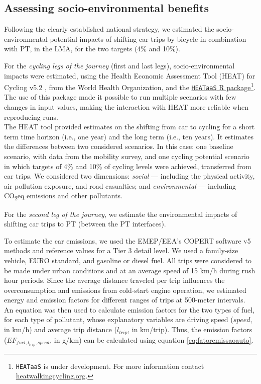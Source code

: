 \documentclass[review, doubleblind, 3p,
authoryear]{elsarticle} %
\begin{document}
\subsection{Assessing socio-environmental
benefits}\label{assessing-socio-environmental-benefits}

Following the clearly established national strategy, we estimated the
socio-environmental potential impacts of shifting car trips by bicycle
in combination with PT, in the LMA, for the two targets (4\% and 10\%).

For the \emph{cycling legs of the journey} (first and last legs),
socio-environmental impacts were estimated, using the Health Economic
Assessment Tool (HEAT) for Cycling v5.2 \citep{HEAT}, from the World
Health Organization, and the
\href{https://github.com/HEAT-WHO/HEAT_heatr_api}{\texttt{HEATaaS} R
package}\footnote{\texttt{HEATaaS} is under development. For more
  information contact
  \href{https://heatwalkingcycling.org}{heatwalkingcycling.org}.}. The
use of this package made it possible to run multiple scenarios with few
changes in input values, making the interaction with HEAT more reliable
when reproducing runs.\\
The HEAT tool provided estimates on the shifting from car to cycling for
a short term time horizon (i.e., one year) and the long term (i.e., ten
years). It estimates the differences between two considered scenarios.
In this case: one baseline scenario, with data from the mobility survey,
and one cycling potential scenario in which targets of 4\% and 10\% of
cycling levels were achieved, transferred from car trips. We considered
two dimensions: \emph{social} --- including the physical activity, air
pollution exposure, and road casualties; and \emph{environmental} ---
including CO\textsubscript{2}eq emissions and other pollutants.

For the \emph{second leg of the journey}, we estimate the environmental
impacts of shifting car trips to PT (between the PT interfaces).

To estimate the car emissions, we used the EMEP/EEA's COPERT software v5
methods and reference values \citep{COPERT} for a Tier 3 detail level.
We used a family-size vehicle, EURO standard, and gasoline or diesel
fuel. All trips were considered to be made under urban conditions and at
an average speed of 15 km/h during rush hour periods. Since the average
distance traveled per trip influences the overconsumption and emissions
from cold-start engine operation, we estimated energy and emission
factors for different ranges of trips at 500-meter intervals.\\
An equation was then used to calculate emission factors for the two
types of fuel, for each type of pollutant, whose explanatory variables
are driving speed (\(speed\), in km/h) and average trip distance
(\(l_{trip}\), in km/trip). Thus, the emission factors
(\(EF_{fuel,l_{trip},speed}\), in g/km) can be calculated using equation
\ref{eq:fatoremissaoauto}.
\end{document}
